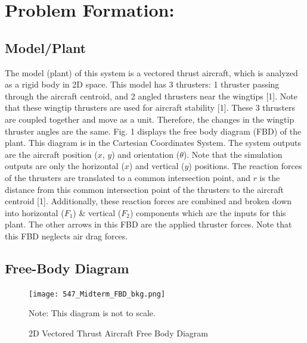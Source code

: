 \documentclass[conference]{IEEEtran}
\begin{document}
\section{Problem Formation:}
\subsection{Model/Plant}
The model (plant) of this system is a vectored thrust aircraft, which is analyzed as a rigid body in 2D space. This model has 3 thrusters: 1 thruster passing through the aircraft centroid, and 2 angled thrusters near the wingtips [1]. Note that these wingtip thrusters are used for aircraft stability [1]. These 3 thrusters are coupled together and move as a unit. Therefore, the changes in the wingtip thruster angles are the same. Fig. 1 displays the free body diagram  (FBD) of the plant.  This diagram is in the Cartesian Coordinates System. The system outputs are the aircraft position ($x$, $y$) and orientation ($\theta$). Note that the simulation outputs are only the horizontal ($x$) and vertical ($y$) positions. The reaction forces of the thrusters are translated to a common intersection point, and $r$ is the distance from this common intersection point of the thrusters to the aircraft centroid [1]. Additionally, these reaction forces are combined and broken down into horizontal ($F_1$) \& vertical ($F_2$) components which are the inputs for this plant. The other arrows in this FBD are the applied thruster forces. Note that this FBD neglects air drag forces.

\subsection{Free-Body Diagram}
\begin{figure}[!htbp]
\centerline{\texttt{[image: 547\_Midterm\_FBD\_bkg.png]}}
\caption{2D Vectored Thrust Aircraft Free Body Diagram}
Note: This diagram is not to scale.
\label{figure1}
\end{figure}
\end{document}
